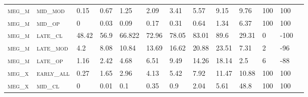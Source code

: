 \begin{landscape}
\begin{table}[!htbp]
\begin{tabular}{@{}lllllllllllll@{}}
\footnotesize \textsc{meg\_m}      & \footnotesize \textsc{mid\_mod  }                & \footnotesize 0.15          & \footnotesize 0.67           & \footnotesize 1.25             & \footnotesize 2.09            & \footnotesize 3.41            & \footnotesize 5.57            & \footnotesize 9.15       & \footnotesize 9.76     & \footnotesize 100    & \footnotesize 100    \\
\footnotesize \textsc{meg\_m}      & \footnotesize \textsc{mid\_op   }                & \footnotesize 0             & \footnotesize 0.03           & \footnotesize 0.09             & \footnotesize 0.17            & \footnotesize 0.31            & \footnotesize 0.64            & \footnotesize 1.34       & \footnotesize 6.37     & \footnotesize 100    & \footnotesize 100    \\
\footnotesize \textsc{meg\_m}      & \footnotesize \textsc{late\_cl  }                & \footnotesize 48.42         & \footnotesize 56.9           & \footnotesize 66.822           & \footnotesize 72.96           & \footnotesize 78.05           & \footnotesize 83.01           & \footnotesize 89.6       & \footnotesize 29.31    & \footnotesize 0      & \footnotesize -100    \\
\footnotesize \textsc{meg\_m}      & \footnotesize \textsc{late\_mod }                & \footnotesize 4.2           & \footnotesize 8.08           & \footnotesize 10.84            & \footnotesize 13.69           & \footnotesize 16.62           & \footnotesize 20.88           & \footnotesize 23.51      & \footnotesize 7.31     & \footnotesize 2      & \footnotesize -96    \\
\footnotesize \textsc{meg\_m}      & \footnotesize \textsc{late\_op  }                & \footnotesize 1.16          & \footnotesize 2.42           & \footnotesize 4.68             & \footnotesize 6.51            & \footnotesize 9.49            & \footnotesize 14.26           & \footnotesize 18.14      & \footnotesize 2.5      & \footnotesize 6      & \footnotesize -88    \\
\footnotesize \textsc{meg\_x}      & \footnotesize \textsc{early\_all}                & \footnotesize 0.27          & \footnotesize 1.65           & \footnotesize 2.96             & \footnotesize 4.13            & \footnotesize 5.42            & \footnotesize 7.92            & \footnotesize 11.47      & \footnotesize 10.88    & \footnotesize 100    & \footnotesize 100    \\
\footnotesize \textsc{meg\_x}      & \footnotesize \textsc{mid\_cl   }                & \footnotesize 0             & \footnotesize 0.01           & \footnotesize 0.1              & \footnotesize 0.35            & \footnotesize 0.9             & \footnotesize 2.04            & \footnotesize 5.61       & \footnotesize 48.8     & \footnotesize 100    & \footnotesize 100    \\

\end{tabular}
\end{table}
\end{landscape}

